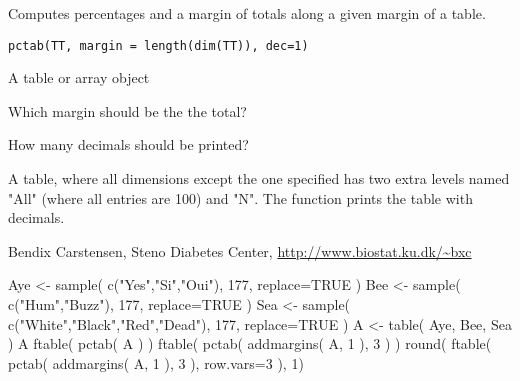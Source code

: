 \begin{Description}\relax
Computes percentages and a margin of totals along a given margin of a table.
\end{Description}
\begin{Usage}
\begin{verbatim}
pctab(TT, margin = length(dim(TT)), dec=1)
\end{verbatim}
\end{Usage}
\begin{Arguments}
\begin{ldescription}
\item[\code{TT}] A table or array object
\item[\code{margin}] Which margin should be the the total?
\item[\code{dec}] How many decimals should be printed?
\end{ldescription}
\end{Arguments}
\begin{Value}
A table, where all dimensions except the one specified 
has two extra levels named "All" (where all entries are 100) and "N".
The function prints the table with  decimals.
\end{Value}
\begin{Author}\relax
Bendix Carstensen, Steno Diabetes Center,
\url{http://www.biostat.ku.dk/~bxc}
\end{Author}
\begin{SeeAlso}\relax
{}
\end{SeeAlso}
\begin{Examples}
\begin{ExampleCode}
Aye <- sample( c("Yes","Si","Oui"), 177, replace=TRUE )
Bee <- sample( c("Hum","Buzz"), 177, replace=TRUE )
Sea <- sample( c("White","Black","Red","Dead"), 177, replace=TRUE )
A <- table( Aye, Bee, Sea )
A
ftable( pctab( A ) )
ftable( pctab( addmargins( A, 1 ), 3 ) )
round( ftable( pctab( addmargins( A, 1 ), 3 ), row.vars=3 ), 1)
\end{ExampleCode}
\end{Examples}

